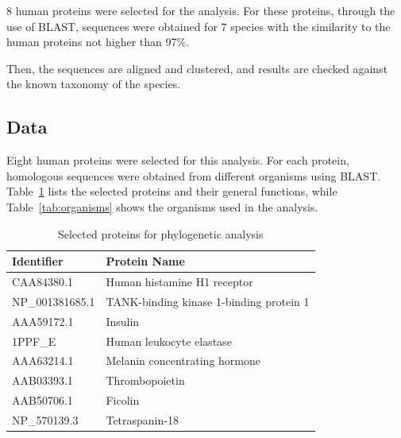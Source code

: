\documentclass[11pt, a4paper, hidelinks]{article}
\begin{document}
8 human proteins were selected for the analysis. For these proteins, through the use of BLAST, sequences were obtained for 7 species with the similarity to the human proteins not higher than 97\%.

Then, the sequences are aligned and clustered, and results are checked against the known taxonomy of the species.

\subsection{Data}\label{subsec:data}

Eight human proteins were selected for this analysis. For each protein, homologous sequences were obtained from different organisms using BLAST. Table~\ref{tab:proteins} lists the selected proteins and their general functions, while Table~\ref{tab:organisms} shows the organisms used in the analysis.

\begin{table}[H]
    \centering
    \caption{Selected proteins for phylogenetic analysis}
    \label{tab:proteins}
    \begin{tabular}{|p{}|p{}|}
        \hline
        \textbf{Identifier} & \textbf{Protein Name} \\
        \hline
        CAA84380.1 & Human histamine H1 receptor \\
        \hline
        NP\_001381685.1 & TANK-binding kinase 1-binding protein 1 \\
        \hline
        AAA59172.1 & Insulin \\
        \hline
        1PPF\_E & Human leukocyte elastase \\
        \hline
        AAA63214.1 & Melanin concentrating hormone \\
        \hline
        AAB03393.1 & Thrombopoietin \\
        \hline
        AAB50706.1 & Ficolin \\
        \hline
        NP\_570139.3 & Tetraspanin-18 \\
        \hline
    \end{tabular}
\end{table}
\end{document}
